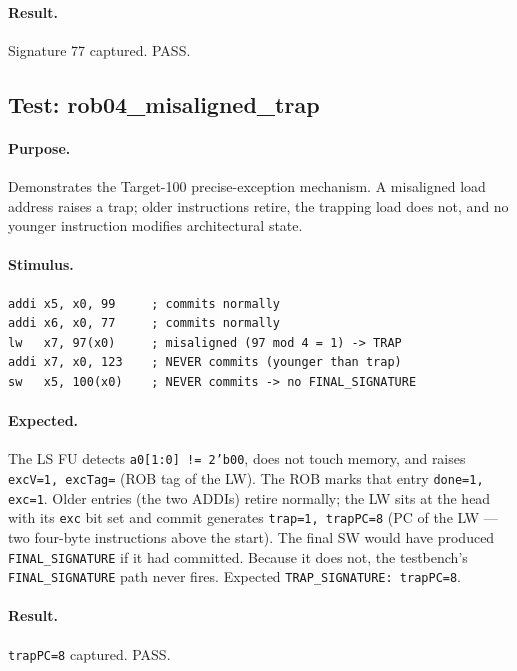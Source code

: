 \documentclass[11pt]{article}
\begin{document}
\paragraph{Result.} Signature 77 captured. PASS.

\subsection{Test: rob04\_misaligned\_trap}
\label{sec:test_rob04}

\paragraph{Purpose.}
Demonstrates the Target-100 precise-exception mechanism. A misaligned load
address raises a trap; older instructions retire, the trapping load does not,
and no younger instruction modifies architectural state.

\paragraph{Stimulus.}
\begin{lstlisting}[style=verilog, caption=Misaligned LW trap (rob04\_misaligned\_trap.s)]
addi x5, x0, 99     ; commits normally
addi x6, x0, 77     ; commits normally
lw   x7, 97(x0)     ; misaligned (97 mod 4 = 1) -> TRAP
addi x7, x0, 123    ; NEVER commits (younger than trap)
sw   x5, 100(x0)    ; NEVER commits -> no FINAL_SIGNATURE
\end{lstlisting}

\paragraph{Expected.}
The LS FU detects \texttt{a0[1:0] != 2'b00}, does not touch memory, and
raises \texttt{excV=1, excTag=} (ROB tag of the LW). The ROB marks that
entry \texttt{done=1, exc=1}. Older entries (the two ADDIs) retire normally;
the LW sits at the head with its \texttt{exc} bit set and
commit generates \texttt{trap=1, trapPC=8} (PC of the LW --- two
four-byte instructions above the start). The final SW would have produced
\texttt{FINAL\_SIGNATURE} if it had committed. Because it does not, the
testbench's \texttt{FINAL\_SIGNATURE} path never fires. Expected
\texttt{TRAP\_SIGNATURE: trapPC=8}.

\paragraph{Result.} \texttt{trapPC=8} captured. PASS.
\end{document}
